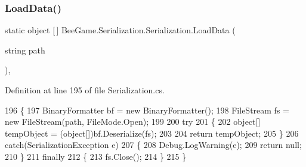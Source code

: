\mbox{\label{class_bee_game_1_1_serialization_1_1_serialization_a733a85a3fd7cb1194269464a71926959}} 
\subsubsection{\texorpdfstring{Load\+Data()}{LoadData()}}
{\footnotesize\ttfamily static object \mbox{[}$\,$\mbox{]} Bee\+Game.\+Serialization.\+Serialization.\+Load\+Data (\begin{DoxyParamCaption}\item[{string}]{path }\end{DoxyParamCaption})\hspace{0.3cm}{\ttfamily [static]}, {\ttfamily [private]}}



Definition at line 195 of file Serialization.\+cs.


\begin{DoxyCode}
196         \{
197             BinaryFormatter bf = \textcolor{keyword}{new} BinaryFormatter();
198             FileStream fs = \textcolor{keyword}{new} FileStream(path, FileMode.Open);
199 
200             \textcolor{keywordflow}{try}
201             \{
202                 \textcolor{keywordtype}{object}[] tempObject = (\textcolor{keywordtype}{object}[])bf.Deserialize(fs);
203 
204                 \textcolor{keywordflow}{return} tempObject;
205             \}
206             \textcolor{keywordflow}{catch}(SerializationException e)
207             \{
208                 Debug.LogWarning(e);
209                 \textcolor{keywordflow}{return} null;
210             \}
211             \textcolor{keywordflow}{finally}
212             \{
213                 fs.Close();
214             \}
215         \}
\end{DoxyCode}
\mbox{\label{class_bee_game_1_1_serialization_1_1_serialization_af06c3b4c0c2baa92fce21403e4fc5372}} 
